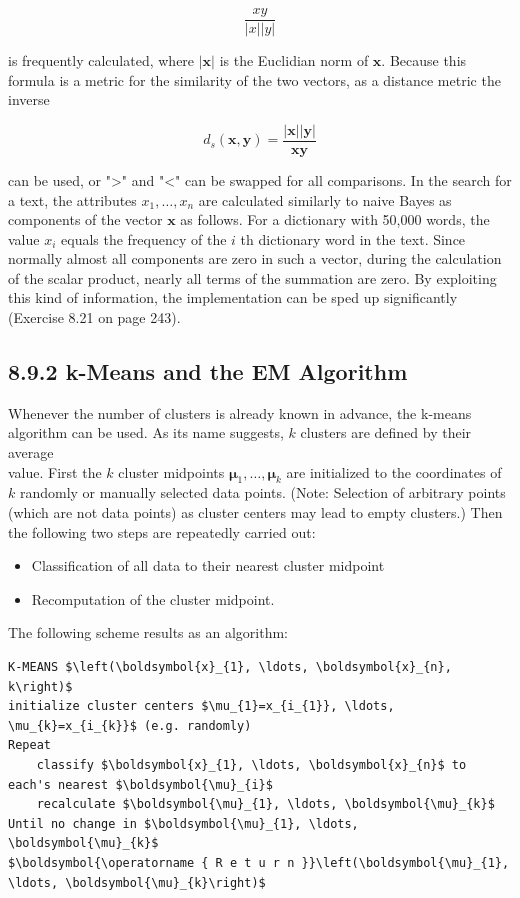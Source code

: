 \documentclass[10pt]{article}
\begin{document}
$$
\frac{x y}{|x||y|}
$$

is frequently calculated, where $|\boldsymbol{x}|$ is the Euclidian norm of $\boldsymbol{x}$. Because this formula is a metric for the similarity of the two vectors, as a distance metric the inverse

$$
d_{s}(\boldsymbol{x}, \boldsymbol{y})=\frac{|\boldsymbol{x}||\boldsymbol{y}|}{\boldsymbol{x} \boldsymbol{y}}
$$

can be used, or ">" and "<" can be swapped for all comparisons. In the search for a text, the attributes $x_{1}, \ldots, x_{n}$ are calculated similarly to naive Bayes as components of the vector $\boldsymbol{x}$ as follows. For a dictionary with 50,000 words, the value $x_{i}$ equals the frequency of the $i$ th dictionary word in the text. Since normally almost all components are zero in such a vector, during the calculation of the scalar product, nearly all terms of the summation are zero. By exploiting this kind of information, the implementation can be sped up significantly (Exercise 8.21 on page 243).

\subsection*{8.9.2 k-Means and the EM Algorithm}
Whenever the number of clusters is already known in advance, the k-means algorithm can be used. As its name suggests, $k$ clusters are defined by their average\\
value. First the $k$ cluster midpoints $\boldsymbol{\mu}_{1}, \ldots, \boldsymbol{\mu}_{k}$ are initialized to the coordinates of $k$ randomly or manually selected data points. (Note: Selection of arbitrary points (which are not data points) as cluster centers may lead to empty clusters.) Then the following two steps are repeatedly carried out:


\begin{itemize}
  \item Classification of all data to their nearest cluster midpoint
  \item Recomputation of the cluster midpoint.
\end{itemize}

The following scheme results as an algorithm:

\begin{verbatim}
K-MEANS $\left(\boldsymbol{x}_{1}, \ldots, \boldsymbol{x}_{n}, k\right)$
initialize cluster centers $\mu_{1}=x_{i_{1}}, \ldots, \mu_{k}=x_{i_{k}}$ (e.g. randomly)
Repeat
    classify $\boldsymbol{x}_{1}, \ldots, \boldsymbol{x}_{n}$ to each's nearest $\boldsymbol{\mu}_{i}$
    recalculate $\boldsymbol{\mu}_{1}, \ldots, \boldsymbol{\mu}_{k}$
Until no change in $\boldsymbol{\mu}_{1}, \ldots, \boldsymbol{\mu}_{k}$
$\boldsymbol{\operatorname { R e t u r n }}\left(\boldsymbol{\mu}_{1}, \ldots, \boldsymbol{\mu}_{k}\right)$
\end{verbatim}
\end{document}
